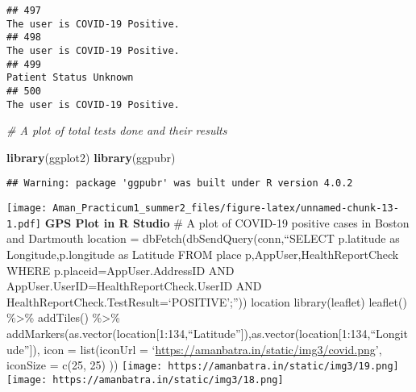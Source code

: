 \documentclass[
]{article}
\newenvironment{Shaded}{\begin{snugshade}}{\end{snugshade}}
\newcommand{\CommentTok}[1]{\textcolor[rgb]{0.56,0.35,0.01}{\textit{#1}}}
\newcommand{\DataTypeTok}[1]{\textcolor[rgb]{0.13,0.29,0.53}{#1}}
\newcommand{\KeywordTok}[1]{\textcolor[rgb]{0.13,0.29,0.53}{\textbf{#1}}}
\newcommand{\NormalTok}[1]{#1}
\newcommand{\OperatorTok}[1]{\textcolor[rgb]{0.81,0.36,0.00}{\textbf{#1}}}
\newcommand{\StringTok}[1]{\textcolor[rgb]{0.31,0.60,0.02}{#1}}
\begin{document}
\begin{verbatim}
## 497                                                                                                                                                                                                                                     The user is COVID-19 Positive.
## 498                                                                                                                                                                                                                                     The user is COVID-19 Positive.
## 499                                                                                                                                                                                                                                             Patient Status Unknown
## 500                                                                                                                                                                                                                                     The user is COVID-19 Positive.
\end{verbatim}

\begin{Shaded}
\begin{Highlighting}[]
\CommentTok{# A plot of total tests done and their results}

\KeywordTok{library}\NormalTok{(ggplot2)}
\KeywordTok{library}\NormalTok{(ggpubr)}
\end{Highlighting}
\end{Shaded}

\begin{verbatim}
## Warning: package 'ggpubr' was built under R version 4.0.2
\end{verbatim}

\begin{Shaded}
\end{Shaded}

\texttt{[image: Aman\_Practicum1\_summer2\_files/figure-latex/unnamed-chunk-13-1.pdf]}
\textbf{GPS Plot in R Studio} \# A plot of COVID-19 positive cases in
Boston and Dartmouth location = dbFetch(dbSendQuery(conn,``SELECT
p.latitude as Longitude,p.longitude as Latitude FROM place
p,AppUser,HealthReportCheck WHERE p.placeid=AppUser.AddressID AND
AppUser.UserID=HealthReportCheck.UserID AND
HealthReportCheck.TestResult=`POSITIVE';'')) location library(leaflet)
leaflet() \%\textgreater\% addTiles() \%\textgreater\%
addMarkers(as.vector(location{[}1:134,``Latitude''{]}),as.vector(location{[}1:134,``Longitude''{]}),
icon = list(iconUrl =
`\url{https://amanbatra.in/static/img3/covid.png}', iconSize = c(25, 25)
)) \texttt{[image: https://amanbatra.in/static/img3/19.png]}
\texttt{[image: https://amanbatra.in/static/img3/18.png]}
\end{document}
